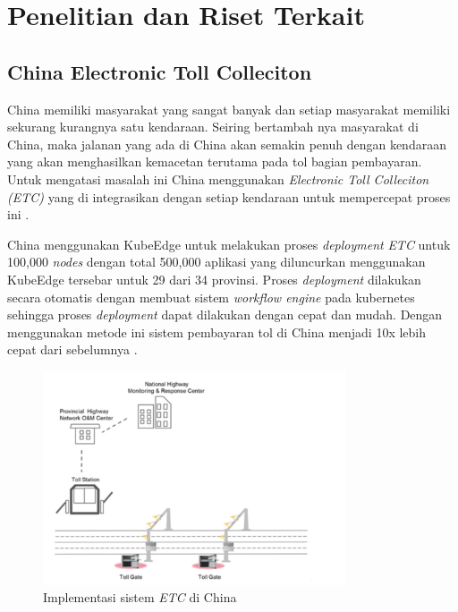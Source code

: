 \section{Penelitian dan Riset Terkait}
\label{sec:riset-terkait}

\subsection{China Electronic Toll Colleciton}
China memiliki masyarakat yang sangat banyak dan setiap masyarakat memiliki sekurang kurangnya satu kendaraan. Seiring bertambah nya masyarakat di China, maka jalanan yang ada di China akan semakin penuh dengan kendaraan yang akan menghasilkan kemacetan terutama pada tol bagian pembayaran. Untuk mengatasi masalah ini China menggunakan \textit{Electronic Toll Colleciton (ETC)} yang di integrasikan dengan setiap kendaraan untuk mempercepat proses ini \parencite{penelitianterkait1}.

China menggunakan KubeEdge untuk melakukan proses \textit{deployment} \textit{ETC} untuk 100,000 \textit{nodes} dengan total 500,000 aplikasi yang diluncurkan menggunakan KubeEdge tersebar untuk 29 dari 34 provinsi. Proses \textit{deployment} dilakukan secara otomatis dengan membuat sistem \textit{workflow engine} pada kubernetes sehingga proses \textit{deployment} dapat dilakukan dengan cepat dan mudah. Dengan menggunakan metode ini sistem pembayaran tol di China menjadi 10x lebih cepat dari sebelumnya \parencite{penelitianterkait1}.

\begin{figure}[h]
  \centering
  \includegraphics[width=0.8\textwidth]{resources/chapter-2/china-highways.jpg}
  \caption{Implementasi sistem \textit{ETC} di China \parencite{penelitianterkait1}}
  \label{fig:china-highways}
\end{figure}

